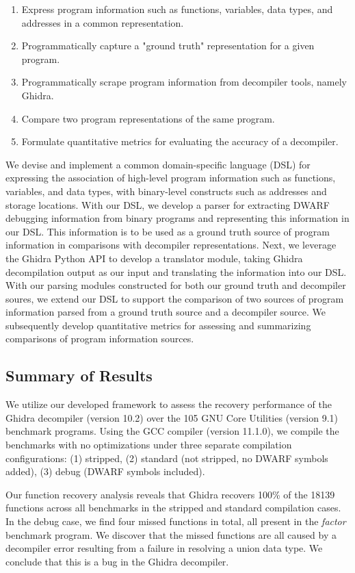 \documentclass[conference]{IEEEtran}
\begin{document}
\begin{enumerate}
    \item Express program information such as functions, variables, data types, and addresses in a common representation.
    \item Programmatically capture a "ground truth" representation for a given program.
    \item Programmatically scrape program information from decompiler tools, namely Ghidra.
    \item Compare two program representations of the same program.
    \item Formulate quantitative metrics for evaluating the accuracy of a decompiler.
\end{enumerate}

We devise and implement a common domain-specific language (DSL) for expressing the association of high-level program information such as functions, variables, and data types, with binary-level constructs such as addresses and storage locations. With our DSL, we develop a parser for extracting DWARF debugging information from binary programs and representing this information in our DSL. This information is to be used as a ground truth source of program information in comparisons with decompiler representations. Next, we leverage the Ghidra Python API to develop a translator module, taking Ghidra decompilation output as our input and translating the information into our DSL. With our parsing modules constructed for both our ground truth and decompiler soures, we extend our DSL to support the comparison of two sources of program information parsed from a ground truth source and a decompiler source. We subsequently develop quantitative metrics for assessing and summarizing comparisons of program information sources.

\subsection{Summary of Results}

We utilize our developed framework to assess the recovery performance of the Ghidra decompiler (version 10.2) over the 105 GNU Core Utilities (version 9.1) benchmark programs. Using the GCC compiler (version 11.1.0), we compile the benchmarks with no optimizations under three separate compilation configurations: (1) stripped, (2) standard (not stripped, no DWARF symbols added), (3) debug (DWARF symbols included).

Our function recovery analysis reveals that Ghidra recovers 100\% of the 18139 functions across all benchmarks in the stripped and standard compilation cases. In the debug case, we find four missed functions in total, all present in the \emph{factor} benchmark program. We discover that the missed functions are all caused by a decompiler error resulting from a failure in resolving a union data type. We conclude that this is a bug in the Ghidra decompiler.
\end{document}

